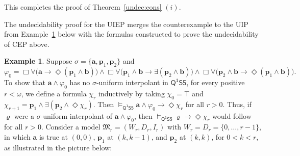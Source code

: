 \documentclass[10pt,a4paper]{amsart}
\theoremstyle{plain}
\theoremstyle{definition}
\newtheorem{exa}[thm]{Example}
\newcommand{\FOMS}{\ensuremath{\mathsf{Q^1S5}}}
\newcommand{\fform}[1]{\boldsymbol{#1}}
\newcommand{\pvar}{\fform{p}}
\newcommand{\avar}{\fform{a}}
\newcommand{\bvar}{\fform{b}}
\newcommand{\Bv}{\forall}
\newcommand{\Bh}{\Box}
\newcommand{\Dv}{\exists}
\newcommand{\Dh}{\Diamond}
\begin{document}
This completes the proof of Theorem~\ref{undec:cons} $(i)$.

The undecidability proof for the UIEP merges the counterexample to the UIP from Example~\ref{ex6} below with the formulas constructed to prove the undecidability of CEP above. 

\begin{exa}\label{ex6}
Suppose $\sigma=\{\avar,\pvar_{1},\pvar_{2}\}$ and 
%
$$
\varphi_{0} = \Bh\Bv \bigl(\avar \rightarrow \Dh (\pvar_{1} \wedge \bvar)\bigr) \land 
		\Bh\Bv \bigl(\pvar_{1} \wedge \bvar \rightarrow \Dv(\pvar_{2} \wedge \bvar)\bigr) \land{} 
\Bh\Bv \bigl(\pvar_{2} \wedge \bvar \rightarrow \Dh(\pvar_1 \wedge \bvar)\bigr).
$$
To show that $\avar \wedge \varphi_{0}$ has no $\sigma$-uniform interpolant in $\FOMS$, for every positive $r < \omega$, we define a formula $\chi_{r}$ inductively by taking $\chi_{0}= \top$ and $\chi_{r+1}= \pvar_{1} \wedge \exists (\pvar_{2} \wedge \Diamond \chi_{r})$. Then $\models_\FOMS\avar \land\varphi_0 \to \Diamond \chi_r$ for all $r>0$. Thus, if $\varrho$ were a $\sigma$-uniform interpolant of $\avar\land\varphi_0$, then
	$\models_\FOMS\varrho\to\Diamond\chi_r$ would follow for all $r>0$. Consider a model $\mathfrak{M}_{r}=(W_{r}, D_{r}, I_{r})$ with $W_{r}=D_{r}=\{0,\dots,r-1\}$, in which $\avar$ is true at $(0,0)$, $\pvar_1$ at $(k,k-1)$, and $\pvar_2$ at $(k,k)$, for $0<k<r$, as illustrated in the picture below: \\
%

\end{exa}
\end{document}
